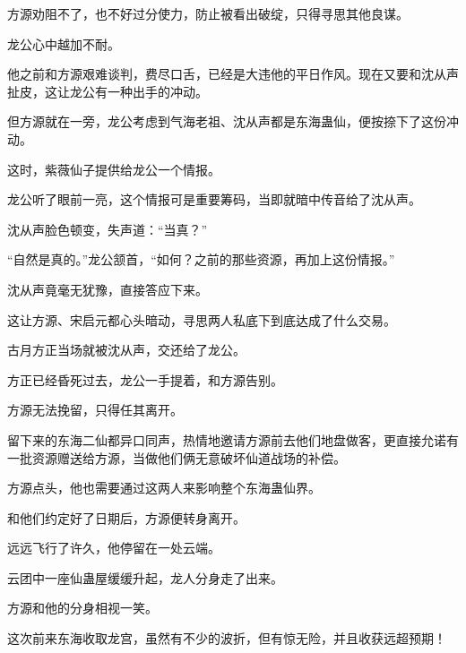 \begin{this_body}
方源劝阻不了，也不好过分使力，防止被看出破绽，只得寻思其他良谋。

龙公心中越加不耐。

他之前和方源艰难谈判，费尽口舌，已经是大违他的平日作风。现在又要和沈从声扯皮，这让龙公有一种出手的冲动。

但方源就在一旁，龙公考虑到气海老祖、沈从声都是东海蛊仙，便按捺下了这份冲动。

这时，紫薇仙子提供给龙公一个情报。

龙公听了眼前一亮，这个情报可是重要筹码，当即就暗中传音给了沈从声。

沈从声脸色顿变，失声道：“当真？”

“自然是真的。”龙公颔首，“如何？之前的那些资源，再加上这份情报。”

沈从声竟毫无犹豫，直接答应下来。

这让方源、宋启元都心头暗动，寻思两人私底下到底达成了什么交易。

古月方正当场就被沈从声，交还给了龙公。

方正已经昏死过去，龙公一手提着，和方源告别。

方源无法挽留，只得任其离开。

留下来的东海二仙都异口同声，热情地邀请方源前去他们地盘做客，更直接允诺有一批资源赠送给方源，当做他们俩无意破坏仙道战场的补偿。

方源点头，他也需要通过这两人来影响整个东海蛊仙界。

和他们约定好了日期后，方源便转身离开。

远远飞行了许久，他停留在一处云端。

云团中一座仙蛊屋缓缓升起，龙人分身走了出来。

方源和他的分身相视一笑。

这次前来东海收取龙宫，虽然有不少的波折，但有惊无险，并且收获远超预期！

\end{this_body}

